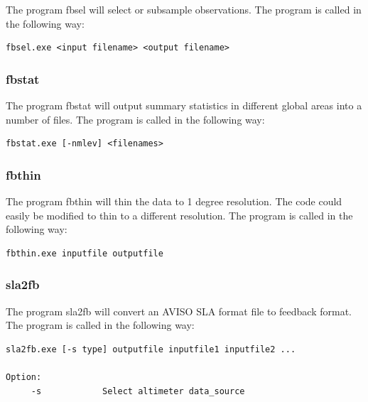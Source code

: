 The program fbsel will select or subsample observations. The program is called in the
following way:

\begin{alltt}
\footnotesize
\begin{verbatim}
fbsel.exe <input filename> <output filename>
\end{verbatim}
\end{alltt}

\subsubsection{fbstat}

The program fbstat will output summary statistics in different global areas into a number of
files. The program is called in the following way:

\begin{alltt}
\footnotesize
\begin{verbatim}
fbstat.exe [-nmlev] <filenames>
\end{verbatim}
\end{alltt}

\subsubsection{fbthin}

The program fbthin will thin the data to 1 degree resolution. The code could easily be
modified to thin to a different resolution. The program is called in the following way:

\begin{alltt}
\footnotesize
\begin{verbatim}
fbthin.exe inputfile outputfile
\end{verbatim}
\end{alltt}

\subsubsection{sla2fb}

The program sla2fb will convert an AVISO SLA format file to feedback format. The program is
called in the following way:

\begin{alltt}
\footnotesize
\begin{verbatim}
sla2fb.exe [-s type] outputfile inputfile1 inputfile2 ...

Option:
     -s            Select altimeter data_source
\end{verbatim}
\end{alltt}

